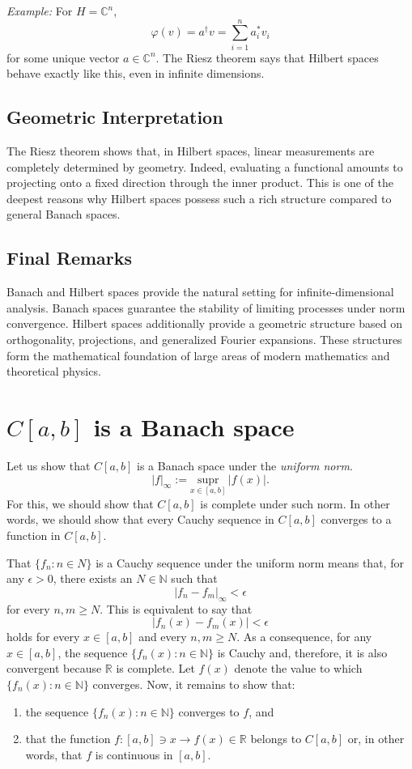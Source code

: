 \documentclass[aps,prl,twocolumn,groupedaddress]{revtex4-2}
\newcommand{\NN}{\mathbb{N}}
\newcommand{\RR}{\mathbb{R}}
\newcommand{\CC}{\mathbb{C}}
\newcommand{\supr}[2]{\underset{#1}{\text{supr}}}
\begin{document}
{\em Example:}
For $H=\CC^n$,
$$
\varphi(v)=a^{\dagger} v = \sum_{i=1}^n a_i^\ast v_i
$$
for some unique vector $a\in \CC^n$.
The Riesz theorem says that Hilbert spaces behave exactly like this, even in infinite dimensions.

\subsection{Geometric Interpretation}

The Riesz theorem shows that, in Hilbert spaces, linear measurements are completely determined by geometry.
Indeed, evaluating a functional amounts to projecting onto a fixed direction through the inner product.
This is one of the deepest reasons why Hilbert spaces possess such a rich structure compared to general Banach spaces.

\subsection{Final Remarks}

Banach and Hilbert spaces provide the natural setting for infinite-dimensional analysis.
Banach spaces guarantee the stability of limiting processes under norm convergence.
Hilbert spaces additionally provide a geometric structure based on orthogonality, projections, and generalized Fourier expansions.
These structures form the mathematical foundation of large areas of modern mathematics and theoretical physics.

\appendix

\section{
$C[a,b]$ is a Banach space
\label{app:A}
}

Let us show that $C[a,b]$ is a Banach space under the {\em uniform norm}.
$$
|f|_{\infty}
:=
\supr{x\in [a,b]}\,\,|f(x)|.
$$
For this, we should show that $C[a,b]$ is complete under such norm.
In other words, we should show that every Cauchy sequence in $C[a,b]$ converges to a function in $C[a,b]$.

That $\{f_n:n\in N\}$ is a Cauchy sequence under the uniform norm means that, for any $\epsilon>0$, there exists an $N\in \NN$ such that
$$
|f_n-f_m|_{\infty}<\epsilon
$$
for every $n,m\geq N$.
This is equivalent to say that
$$
|f_n(x)-f_m(x)|<\epsilon
$$
holds for every $x\in [a,b]$ and every $n,m\geq N$.
As a consequence, for any $x\in [a,b]$, the sequence $\{f_n(x):n\in \NN\}$ is Cauchy and, therefore, it is also convergent because $\RR$ is complete.
Let $f(x)$ denote the value to which $\{f_n(x):n\in \NN\}$ converges.
Now, it remains to show that:
\begin{enumerate}
\item the sequence $\{f_n(x):n\in \NN\}$ converges to $f$, and
\item that the function $f:[a,b]\ni x\to f(x)\in \RR$ belongs to $C[a,b]$ or, in other words, that $f$ is continuous in $[a,b]$.
\end{enumerate}
\end{document}
